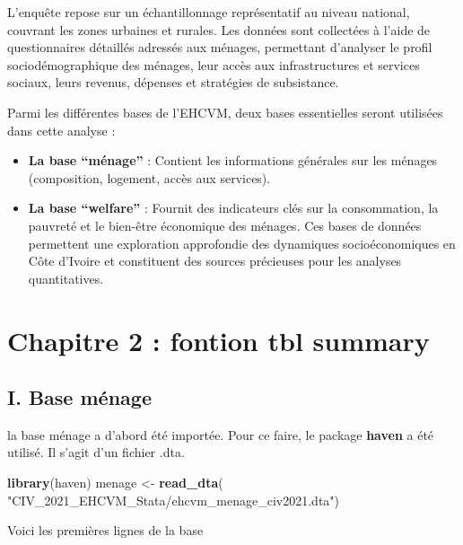 \documentclass[
]{article}
\newenvironment{Shaded}{\begin{snugshade}}{\end{snugshade}}
\newcommand{\FunctionTok}[1]{\textcolor[rgb]{0.13,0.29,0.53}{\textbf{#1}}}
\newcommand{\NormalTok}[1]{#1}
\newcommand{\OtherTok}[1]{\textcolor[rgb]{0.56,0.35,0.01}{#1}}
\newcommand{\StringTok}[1]{\textcolor[rgb]{0.31,0.60,0.02}{#1}}
\begin{document}
L'enquête repose sur un échantillonnage représentatif au niveau
national, couvrant les zones urbaines et rurales. Les données sont
collectées à l'aide de questionnaires détaillés adressés aux ménages,
permettant d'analyser le profil sociodémographique des ménages, leur
accès aux infrastructures et services sociaux, leurs revenus, dépenses
et stratégies de subsistance.

Parmi les différentes bases de l'EHCVM, deux bases essentielles seront
utilisées dans cette analyse :

\begin{itemize}
\item
  \textbf{La base ``ménage''} : Contient les informations générales sur
  les ménages (composition, logement, accès aux services).
\item
  \textbf{La base ``welfare''} : Fournit des indicateurs clés sur la
  consommation, la pauvreté et le bien-être économique des ménages. Ces
  bases de données permettent une exploration approfondie des dynamiques
  socioéconomiques en Côte d'Ivoire et constituent des sources
  précieuses pour les analyses quantitatives.
\end{itemize}

\newpage

\section*{Chapitre 2 : fontion tbl summary}

\subsection{I. Base ménage}\label{i.-base-muxe9nage}

la base ménage a d'abord été importée. Pour ce faire, le package
\textbf{haven} a été utilisé. Il s'agit d'un fichier .dta.

\begin{Shaded}
\begin{Highlighting}[]
\FunctionTok{library}\NormalTok{(haven)}
\NormalTok{menage }\OtherTok{\textless{}{-}} \FunctionTok{read\_dta}\NormalTok{(}
  \StringTok{"CIV\_2021\_EHCVM\_Stata/ehcvm\_menage\_civ2021.dta"}\NormalTok{)}
\end{Highlighting}
\end{Shaded}

Voici les premières lignes de la base
\end{document}
